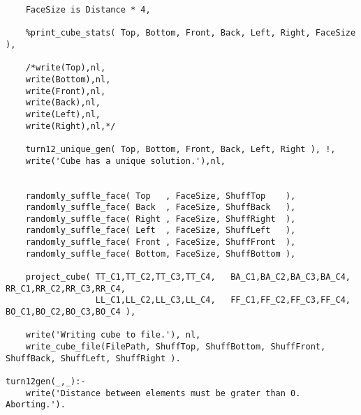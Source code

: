 \begin{lstlisting}
	FaceSize is Distance * 4,
	
	%print_cube_stats( Top, Bottom, Front, Back, Left, Right, FaceSize ),

	/*write(Top),nl,
	write(Bottom),nl,
	write(Front),nl,
	write(Back),nl,
	write(Left),nl,
	write(Right),nl,*/
	
	turn12_unique_gen( Top, Bottom, Front, Back, Left, Right ), !,
	write('Cube has a unique solution.'),nl,
	

	randomly_suffle_face( Top   , FaceSize, ShuffTop    ),
	randomly_suffle_face( Back  , FaceSize, ShuffBack   ),
	randomly_suffle_face( Right , FaceSize, ShuffRight  ),
	randomly_suffle_face( Left  , FaceSize, ShuffLeft   ),
	randomly_suffle_face( Front , FaceSize, ShuffFront  ),
	randomly_suffle_face( Bottom, FaceSize, ShuffBottom ),
	
	project_cube( TT_C1,TT_C2,TT_C3,TT_C4,   BA_C1,BA_C2,BA_C3,BA_C4,   RR_C1,RR_C2,RR_C3,RR_C4,
                  LL_C1,LL_C2,LL_C3,LL_C4,   FF_C1,FF_C2,FF_C3,FF_C4,   BO_C1,BO_C2,BO_C3,BO_C4 ),
				  
	write('Writing cube to file.'), nl,
	write_cube_file(FilePath, ShuffTop, ShuffBottom, ShuffFront, ShuffBack, ShuffLeft, ShuffRight ).

turn12gen(_,_):-
	write('Distance between elements must be grater than 0. Aborting.').

\end{lstlisting}